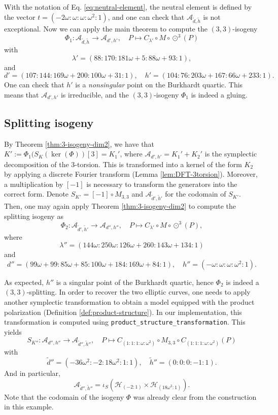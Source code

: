 \documentclass[11pt]{amsart}
\theoremstyle{definition}
\newcommand{\A}{\mathcal{A}}
\renewcommand{\H}{\mathcal{H}}
\newcommand{\HH}{\mathcal{H}}
\let \H\HH
\newcommand{\cube}{\odot^3}
\begin{document}
With the notation of Eq. \ref{eq:neutral-element}, the neutral element is defined by the vector $t= (-2\omega:\omega:\omega:\omega^2:1)$, and one can check that $\A_{\tilde d, \tilde h}$ is not exceptional. 
Now we can apply the main theorem to compute the $(3,3)$-isogeny
\[
\Phi_1: \A_{\tilde d, \tilde h} \to \A_{d',h'}, \quad P \mapsto C_{\lambda'} \circ M \circ \cube(P)
\]
with
\[
\lambda' = (88: 170: 181\omega + 5: 88\omega + 93: 1),
\]
and 
\[
d' = (107: 144 : 169\omega + 200: 100\omega + 31:1),\quad h' = (104: 76: 203\omega + 167: 66\omega + 233: 1).
\]
One can check that $h'$ is a {\em nonsingular} point on the Burkhardt quartic. This means that $\A_{d',h'}$ is irreducible, and the $(3,3)$-isogeny $\Phi_1$ is indeed a gluing. 

\subsection{Splitting isogeny}
By Theorem \ref{thm:3-isogeny-dim2}, we have that $K':=\Phi_1(S_K(\ker(\Phi))[3] = K_1'$, where $\A_{d',h'} = K_1' + K_2'$ is the symplectic decomposition of the $3$-torsion. This is transformed into a kernel of the form $K_2$ by applying a discrete Fourier transform (Lemma \ref{lem:DFT-3torsion}). Moreover, a multiplication by $[-1]$ is necessary to transform the generators into the correct form. Denote $S_{K'} = [-1] \circ M_{3,3}$ and $\A_{\tilde d',\tilde h'}$ for the codomain of $S_{K'}$. Then, one may again apply Theorem \ref{thm:3-isogeny-dim2} to compute the splitting isogeny as
\[
\Phi_2: \A_{\tilde d',\tilde h'} \to \A_{d'',h''}, \quad P \mapsto  C_{\lambda'} \circ M \circ \cube(P),
\]
where 
\[
\lambda'' = (144\omega:  250\omega: 126\omega + 260: 143\omega + 134: 1)
\]
and 
\[d'' = (99\omega + 99: 85\omega + 85: 100\omega + 184: 169\omega + 84: 1)
 ,\quad h'' = (-\omega: \omega: \omega:\omega^2: 1)
.\]

As expected, $h''$ is a singular point of the Burkhardt quartic, hence $\Phi_2$ is indeed a $(3,3)$-splitting. In order to recover the two elliptic curves, one needs to apply another symplectic transformation to obtain a model equipped with the product polarization (Definition \ref{def:product-structure}). In our implementation, this transformation is computed using \texttt{product\_structure\_transformation}. This yields
\[
S_{K''}: \A_{d'',h''} \to \A_{\tilde d'',\tilde h''}, \quad P \mapsto C_{(1:1:1:\omega:\omega^2)} \circ M_{3,3} \circ C_{(1:1:1:\omega:\omega^2)} (P)
\]
with 
\[
\tilde d'' = (-36\omega^2: -2: 18 \omega^2: 1: 1)
,\quad \tilde h'' = (0:0:0:-1:1).
\]
And in particular,
\[
\A_{\tilde d'',\tilde h''} =  \iota_S\left(\H_{(-2:1)} \times \H_{(18\omega^2:1)} \right).
\]
Note that the codomain of the isogeny $\Phi$ was already clear from the construction in this example.
\end{document}
